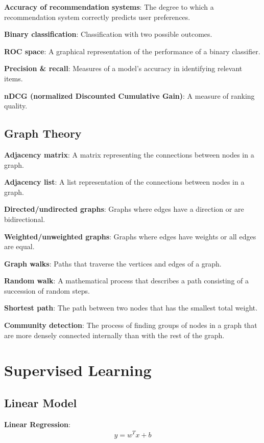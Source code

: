 \documentclass{article}
\begin{document}
\textbf{Accuracy of recommendation systems}: The degree to which a recommendation system correctly predicts user preferences.

\textbf{Binary classification}: Classification with two possible outcomes.

\textbf{ROC space}: A graphical representation of the performance of a binary classifier.

\textbf{Precision \& recall}: Measures of a model's accuracy in identifying relevant items.

\textbf{nDCG (normalized Discounted Cumulative Gain)}: A measure of ranking quality.

\subsection{Graph Theory}
\textbf{Adjacency matrix}: A matrix representing the connections between nodes in a graph.

\textbf{Adjacency list}: A list representation of the connections between nodes in a graph.

\textbf{Directed/undirected graphs}: Graphs where edges have a direction or are bidirectional.

\textbf{Weighted/unweighted graphs}: Graphs where edges have weights or all edges are equal.

\textbf{Graph walks}: Paths that traverse the vertices and edges of a graph.

\textbf{Random walk}: A mathematical process that describes a path consisting of a succession of random steps.

\textbf{Shortest path}: The path between two nodes that has the smallest total weight.

\textbf{Community detection}: The process of finding groups of nodes in a graph that are more densely connected internally than with the rest of the graph.

\section{Supervised Learning}

\subsection{Linear Model}
\textbf{Linear Regression}: 
\begin{align*}
    y = w^T x + b
\end{align*}
\end{document}
